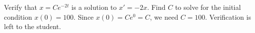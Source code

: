 {Verify that $x = C e^{-2t}$ is a solution to $x' = -2x$.
Find $C$ to solve for the initial condition $x(0) = 100$.}
{Since $x(0)=Ce^{0}=C$, we need $C=100$. Verification is left to the student.}